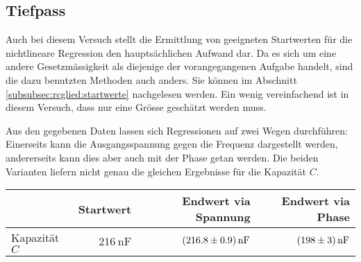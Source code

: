 \clearpage
\subsection{Tiefpass}

Auch bei diesem Versuch stellt die Ermittlung von geeigneten Startwerten f\"ur
die nichtlineare Regression  den haupts\"achlichen Aufwand dar. Da  es sich um
eine  andere  Gesetzm\"assigkeit  als diejenige  der  vorangegangenen  Aufgabe
handelt,  sind  die  dazu  benutzten Methoden  auch  anders. Sie  k\"onnen  im
Abschnitt  \ref{subsubsec:rcglied:startwerte} nachgelesen  werden.  Ein  wenig
vereinfachend ist in diesem Versuch, dass nur eine Gr\"osse gesch\"atzt werden
muss.

Aus   den  gegebenen   Daten   lassen  sich   Regressionen   auf  zwei   Wegen
durchf\"uhren: Einerseits  kann   die  Ausgangsspannung  gegen   die  Frequenz
dargestellt  werden, andererseits  kann dies  aber  auch mit  der Phase  getan
werden. Die beiden Varianten liefern nicht genau die gleichen Ergebnisse f\"ur
die Kapazit\"at $C$.

\begin{center}
\begin{tabular}{lrrr}
    \toprule
                                & Startwert                  & Endwert via Spannung              & Endwert via Phase \\
    \midrule
    Kapazit\"at $C$             &  $\SI{216}{\nano\farad}$   & $\SI{216.8 \pm 0.9}{\nano\farad}$ & $\SI{198 \pm 3}{\nano\farad}$ \\
    \bottomrule
\end{tabular}
\end{center}

